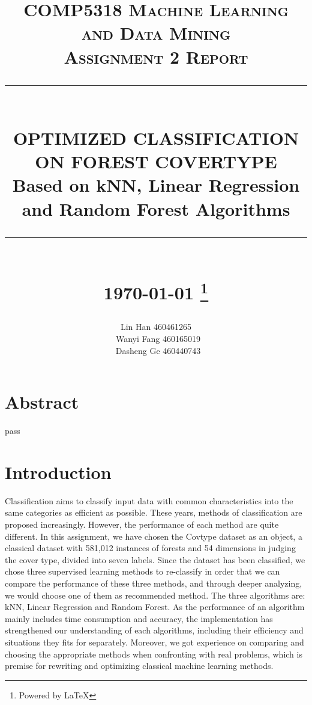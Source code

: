 \documentclass[12pt]{report}
\newcommand{\HRule}[1]{\rule{\linewidth}{#1}}
\begin{document}
\title{ \normalsize \textsc{COMP5318 Machine Learning and Data Mining 
		\\Assignment 2 Report}
		\\ [2.0cm]
		\HRule{0.5pt} \\
		\LARGE \textbf{\uppercase{Optimized Classification on Forest Covertype }}
        \\ \normalsize Based on kNN, Linear Regression and Random Forest Algorithms
		\HRule{2pt} \\ [0.5cm]
		\normalsize \today \vspace*{5\baselineskip}
        \footnote{Powered by \LaTeX}}

\date{}

\author{
        Lin Han 460461265 \\
        \ Wanyi Fang 460165019 \\
        \ Dasheng Ge 460440743}

\maketitle
\tableofcontents
\newpage

\sectionfont{\scshape}


\section*{Abstract}
pass
\newpage



\section*{Introduction}
Classification aims to classify input data with common characteristics into the same categories as efficient as possible. These years, methods of classification are  proposed increasingly. However, the performance of each method are quite different. 
\newline
\newline
In this assignment, we have chosen the Covtype dataset as an object, a classical dataset with 581,012 instances of forests and 54 dimensions in judging the cover type, divided into seven labels. Since the dataset has been classified, we chose three supervised learning methods to re-classify in order that we can compare the performance of these three methods, and through deeper analyzing, we would choose one of them as recommended method. The three algorithms are: kNN, Linear Regression and Random Forest. 
\newline
\newline
As the performance of an algorithm mainly includes time consumption and accuracy, the implementation has strengthened our understanding of each algorithms, including their efficiency and situations they fits for separately. Moreover, we got experience on comparing and choosing the appropriate methods when confronting with real problems, which is premise for rewriting and optimizing classical machine learning methods.
\end{document}
